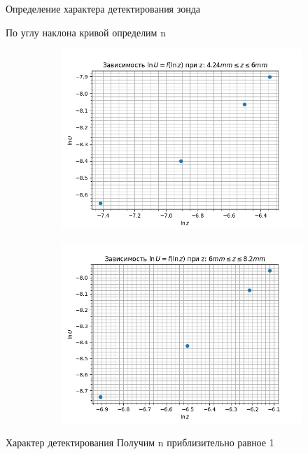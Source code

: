 \documentclass[12pt]{beamer}
\begin{document}
\begin{frame}{Определение характера детектирования зонда}

    \begin{block}{}
        \centering
        По углу наклона кривой определим n
    \end{block}

    \begin{figure}[!h]
        \centering
        \begin{subfigure}{0.5\textwidth} %
            \centering
            \includegraphics[scale=0.25]{1.jpg}
        \end{subfigure}
        \hfill
        \begin{subfigure}{0.48\textwidth} %
            \centering
            \includegraphics[scale=0.25]{2.jpg}
        \end{subfigure}
    \end{figure}

    \begin{block}{Характер детектирования}
        \centering
       Получим n приблизительно равное 1
    \end{block}

\end{frame}
\end{document}
